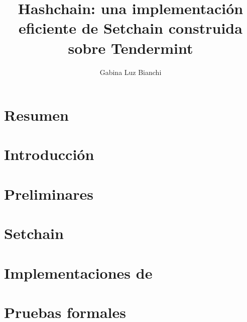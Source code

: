 \documentclass[a4paper, 11pt]{book}
\title{Hashchain: una implementación eficiente de Setchain construida sobre Tendermint}
\author{Gabina Luz Bianchi}
\begin{document}
\frontmatter %



\chapter{Resumen}


\tableofcontents{}

\mainmatter %

\begin{sloppypar}

% 

\chapter{Introducción}\label{chapter:introduction}


\chapter{Preliminares}\label{chapter:prelimnaries}


\chapter{Setchain}\label{chapter:setchain}


\chapter{Implementaciones de \setchain}\label{chapter:sol}


\chapter{Pruebas formales}\label{chapter:proofs}



\end{sloppypar}
\end{document}
